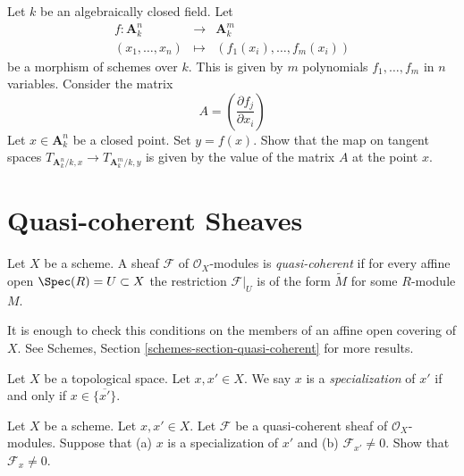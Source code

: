 \begin{exercise}
\label{exercise-Jacobian}
Let $k$ be an algebraically closed field.
Let
\begin{eqnarray*}
f : \mathbf{A}_k^n & \longrightarrow & \mathbf{A}^m_k \\
(x_1, \ldots, x_n) & \longmapsto & (f_1(x_i), \ldots, f_m(x_i))
\end{eqnarray*}
be a morphism of schemes over $k$. This is given by
$m$ polynomials $f_1, \ldots, f_m$ in $n$ variables.
Consider the matrix
$$
A = \left( \frac{\partial f_j}{\partial x_i} \right)
$$
Let $x \in \mathbf{A}^n_k$ be a closed point.
Set $y =  f(x)$. Show that the map on tangent spaces
$T_{\mathbf{A}^n_k/k, x} \to T_{\mathbf{A}^m_k/k, y}$
is given by the value of the matrix $A$ at the point $x$.
\end{exercise}














\section{Quasi-coherent Sheaves}
\label{section-quasi-coherent}

\begin{definition}
\label{definition-quasi-coherent}
Let $X$ be a scheme.
A sheaf $\mathcal{F}$ of $\mathcal{O}_X$-modules is {\it quasi-coherent}
if for every affine open $\Spec(R) = U \subset X$ the restriction
$\mathcal{F}|_U$ is of the form $\widetilde M$ for some $R$-module
$M$.
\end{definition}

\noindent
It is enough to check this conditions on the members of an
affine open covering of $X$.
See Schemes, Section \ref{schemes-section-quasi-coherent}
for more results.

\begin{definition}
\label{definition-specialization}
Let $X$ be a topological space. Let $x, x' \in X$.
We say $x$ is a {\it specialization} of $x'$
if and only if $x \in \overline{\{x'\}}$.
\end{definition}

\begin{exercise}
\label{exercise-quasi-coherent-specialization-points}
Let $X$ be a scheme. Let $x, x' \in X$. Let $\mathcal{F}$ be
a quasi-coherent sheaf of $\mathcal{O}_X$-modules.
Suppose that (a) $x$ is a specialization of $x'$ and (b)
$\mathcal{F}_{x'} \not = 0$. Show that $\mathcal{F}_x \not = 0$.
\end{exercise}

